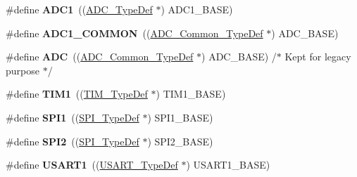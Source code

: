\begin{DoxyCompactItemize}
\mbox{\label{group___peripheral__declaration_ga90d2d5c526ce5c0a551f533eccbee71a}} 
\#define {\bfseries A\+D\+C1}~((\hyperlink{struct_a_d_c___type_def}{A\+D\+C\+\_\+\+Type\+Def} $\ast$) A\+D\+C1\+\_\+\+B\+A\+SE)
\item 
\mbox{\label{group___peripheral__declaration_gaf1919c64fc774aab31190346fd5457e2}} 
\#define {\bfseries A\+D\+C1\+\_\+\+C\+O\+M\+M\+ON}~((\hyperlink{struct_a_d_c___common___type_def}{A\+D\+C\+\_\+\+Common\+\_\+\+Type\+Def} $\ast$) A\+D\+C\+\_\+\+B\+A\+SE)
\item 
\mbox{\label{group___peripheral__declaration_ga54d148b91f3d356713f7e367a2243bea}} 
\#define {\bfseries A\+DC}~((\hyperlink{struct_a_d_c___common___type_def}{A\+D\+C\+\_\+\+Common\+\_\+\+Type\+Def} $\ast$) A\+D\+C\+\_\+\+B\+A\+SE) /$\ast$ Kept for legacy purpose $\ast$/
\item 
\mbox{\label{group___peripheral__declaration_ga2e87451fea8dc9380056d3cfc5ed81fb}} 
\#define {\bfseries T\+I\+M1}~((\hyperlink{struct_t_i_m___type_def}{T\+I\+M\+\_\+\+Type\+Def} $\ast$) T\+I\+M1\+\_\+\+B\+A\+SE)
\item 
\mbox{\label{group___peripheral__declaration_gad483be344a28ac800be8f03654a9612f}} 
\#define {\bfseries S\+P\+I1}~((\hyperlink{struct_s_p_i___type_def}{S\+P\+I\+\_\+\+Type\+Def} $\ast$) S\+P\+I1\+\_\+\+B\+A\+SE)
\item 
\mbox{\label{group___peripheral__declaration_gaf2c3d8ce359dcfbb2261e07ed42af72b}} 
\#define {\bfseries S\+P\+I2}~((\hyperlink{struct_s_p_i___type_def}{S\+P\+I\+\_\+\+Type\+Def} $\ast$) S\+P\+I2\+\_\+\+B\+A\+SE)
\item 
\mbox{\label{group___peripheral__declaration_ga92871691058ff7ccffd7635930cb08da}} 
\#define {\bfseries U\+S\+A\+R\+T1}~((\hyperlink{struct_u_s_a_r_t___type_def}{U\+S\+A\+R\+T\+\_\+\+Type\+Def} $\ast$) U\+S\+A\+R\+T1\+\_\+\+B\+A\+SE)
\item 
\mbox{\label{group___peripheral__declaration_ga87e4b442041d1c03a6af113fbe04a182}} 

\end{DoxyCompactItemize}
